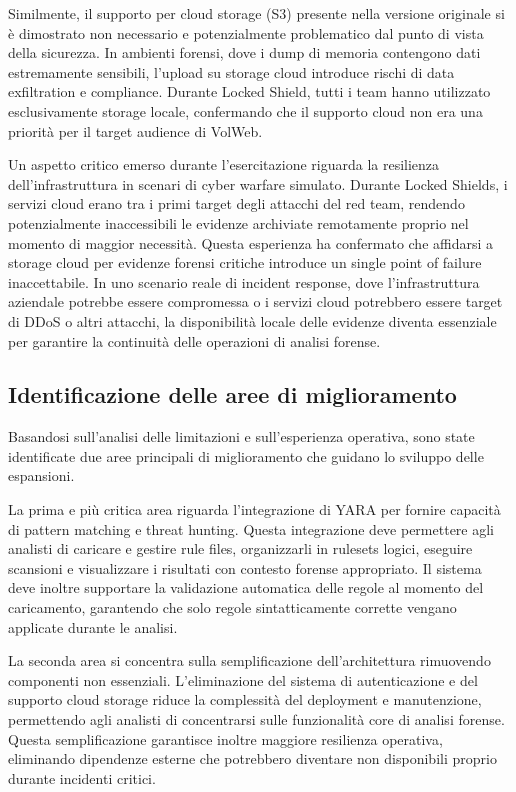 Similmente, il supporto per cloud storage (S3) presente nella versione originale si è dimostrato non necessario e potenzialmente problematico dal punto di vista della sicurezza. In ambienti forensi, dove i dump di memoria contengono dati estremamente sensibili, l'upload su storage cloud introduce rischi di data exfiltration e compliance. Durante Locked Shield, tutti i team hanno utilizzato esclusivamente storage locale, confermando che il supporto cloud non era una priorità per il target audience di VolWeb.

Un aspetto critico emerso durante l'esercitazione riguarda la resilienza dell'infrastruttura in scenari di cyber warfare simulato. Durante Locked Shields, i servizi cloud erano tra i primi target degli attacchi del red team, rendendo potenzialmente inaccessibili le evidenze archiviate remotamente proprio nel momento di maggior necessità. Questa esperienza ha confermato che affidarsi a storage cloud per evidenze forensi critiche introduce un single point of failure inaccettabile. In uno scenario reale di incident response, dove l'infrastruttura aziendale potrebbe essere compromessa o i servizi cloud potrebbero essere target di DDoS o altri attacchi, la disponibilità locale delle evidenze diventa essenziale per garantire la continuità delle operazioni di analisi forense.

\subsection{Identificazione delle aree di miglioramento}

Basandosi sull'analisi delle limitazioni e sull'esperienza operativa, sono state identificate due aree principali di miglioramento che guidano lo sviluppo delle espansioni.

La prima e più critica area riguarda l'integrazione di YARA per fornire capacità di pattern matching e threat hunting. Questa integrazione deve permettere agli analisti di caricare e gestire rule files, organizzarli in rulesets logici, eseguire scansioni e visualizzare i risultati con contesto forense appropriato. Il sistema deve inoltre supportare la validazione automatica delle regole al momento del caricamento, garantendo che solo regole sintatticamente corrette vengano applicate durante le analisi.

La seconda area si concentra sulla semplificazione dell'architettura rimuovendo componenti non essenziali. L'eliminazione del sistema di autenticazione e del supporto cloud storage riduce la complessità del deployment e manutenzione, permettendo agli analisti di concentrarsi sulle funzionalità core di analisi forense. Questa semplificazione garantisce inoltre maggiore resilienza operativa, eliminando dipendenze esterne che potrebbero diventare non disponibili proprio durante incidenti critici.

